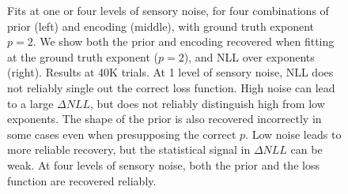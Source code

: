 \documentclass[si.tex]{subfiles}
\begin{document}
\begin{figure}
\begin{tikzpicture}[every node/.style={inner sep=0, anchor=north west}]
\end{tikzpicture}

\caption{Fits at one or four levels of sensory noise, for four combinations of prior (left) and encoding (middle), with ground truth exponent $p=2$. We show both the prior and encoding recovered when fitting at the ground truth exponent ($p=2$), and NLL over exponents (right). Results at 40K trials. At 1 level of sensory noise, NLL does not reliably single out the correct loss function. High noise can lead to a large $\Delta NLL$, but does not reliably distinguish high from low exponents. The shape of the prior is also recovered incorrectly in some cases even when presupposing the correct $p$. Low noise leads to more reliable recovery, but the statistical signal in $\Delta NLL$ can be weak. At four levels of sensory noise, both the prior and the loss function are recovered reliably.}\label{fig:known-loss-unknown-prior}

\end{figure}
\end{document}
